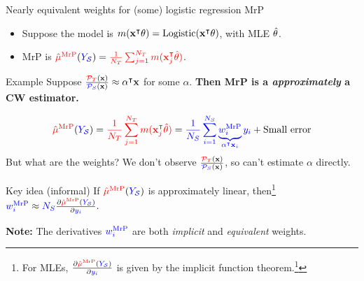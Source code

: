 \begin{frame}[t]{Nearly equivalent weights for (some) logistic regression MrP}

\def\alphav{\mathbf{\alpha}}
%
\begin{itemize}
    \item Suppose the model is $m(\mathbf{x}^\intercal \theta) = \mathrm{Logistic}(\mathbf{x}^\intercal \theta)$, with MLE $\hat{\theta}$.
    \item MrP is $\textcolor{red}{\hat{\mu}^{\mathrm{MrP}}}(\textcolor{blue}{\textcolor{blue}{Y_{\mathcal{S}}}}) = \textcolor{red}{\frac{1}{{\textcolor{red}{N_T}}} \sum_{j=1}^{\textcolor{red}{N_T}} m(\mathbf{x}_j^\intercal \hat{\theta})}$.
\end{itemize}
%
\begin{block}{Example}
Suppose
    $\frac{\ptar(\x)}{\psur(\x)} \approx \alphav^\trans \x$ for some $\alpha$.
    \textbf{Then MrP is a \emph{approximately} a CW estimator.}
\end{block}

$$
\begin{aligned}
\muhatmrp =
    \tarcol{\meantar \m(\x_j^\trans \thetahat)} ={}
    \surcol{
        \meansur
        \underbrace{\w_i^\mrp}_{\alphav^\trans \x_i} \y_i
    }  + \textrm{Small error}
\end{aligned}
$$
\pause
But what are the weights?
We don't observe $\frac{\textcolor{red}{\mathcal{P}_{T}}(\mathbf{x})}{\textcolor{blue}{{\mathcal{P}_{S}}}(\mathbf{x})}$, so can't estimate $\alpha$
directly.\pause

\begin{block}{Key idea (informal)}
\centering
If $\textcolor{red}{\hat{\mu}^{\mathrm{MrP}}}(\textcolor{blue}{\textcolor{blue}{Y_{\mathcal{S}}}})$ is approximately linear, then\footnote{
For MLEs, $\frac{\partial \textcolor{red}{\hat{\mu}^{\mathrm{MrP}}}(\textcolor{blue}{\textcolor{blue}{Y_{\mathcal{S}}}})}{\partial \textcolor{blue}{y_i}}$
is given by the implicit function theorem.\footcite{krantz:2012:implicit,giordano:2019:swiss}
}
$\textcolor{blue}{w_i^{\mathrm{MrP}}} \approx {\textcolor{blue}{N_S}} \frac{\partial \textcolor{red}{\hat{\mu}^{\mathrm{MrP}}}(\textcolor{blue}{\textcolor{blue}{Y_{\mathcal{S}}}})}{\partial \textcolor{blue}{y_i}}.$
\\[1em]
\end{block}\pause

\vspace{0.5em}
\textbf{Note:} The derivatives $\textcolor{blue}{w_i^{\mathrm{MrP}}}$ are both \emph{implicit} and \emph{equivalent} weights.
\vspace{1em}

\end{frame}




